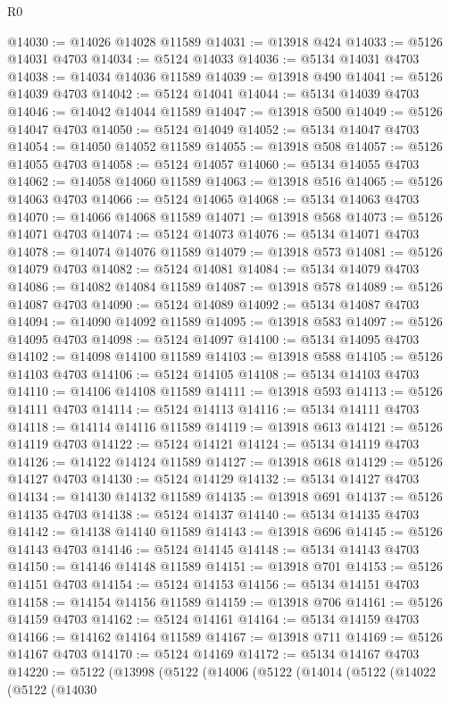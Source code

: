 \begin{lexlean}{R0}
\begin{coremodule}
@14030 := @14026 @14028 @11589
@14031 := @13918 @424
@14033 := @5126 @14031 @4703
@14034 := @5124 @14033
@14036 := @5134 @14031 @4703
@14038 := @14034 @14036 @11589
@14039 := @13918 @490
@14041 := @5126 @14039 @4703
@14042 := @5124 @14041
@14044 := @5134 @14039 @4703
@14046 := @14042 @14044 @11589
@14047 := @13918 @500
@14049 := @5126 @14047 @4703
@14050 := @5124 @14049
@14052 := @5134 @14047 @4703
@14054 := @14050 @14052 @11589
@14055 := @13918 @508
@14057 := @5126 @14055 @4703
@14058 := @5124 @14057
@14060 := @5134 @14055 @4703
@14062 := @14058 @14060 @11589
@14063 := @13918 @516
@14065 := @5126 @14063 @4703
@14066 := @5124 @14065
@14068 := @5134 @14063 @4703
@14070 := @14066 @14068 @11589
@14071 := @13918 @568
@14073 := @5126 @14071 @4703
@14074 := @5124 @14073
@14076 := @5134 @14071 @4703
@14078 := @14074 @14076 @11589
@14079 := @13918 @573
@14081 := @5126 @14079 @4703
@14082 := @5124 @14081
@14084 := @5134 @14079 @4703
@14086 := @14082 @14084 @11589
@14087 := @13918 @578
@14089 := @5126 @14087 @4703
@14090 := @5124 @14089
@14092 := @5134 @14087 @4703
@14094 := @14090 @14092 @11589
@14095 := @13918 @583
@14097 := @5126 @14095 @4703
@14098 := @5124 @14097
@14100 := @5134 @14095 @4703
@14102 := @14098 @14100 @11589
@14103 := @13918 @588
@14105 := @5126 @14103 @4703
@14106 := @5124 @14105
@14108 := @5134 @14103 @4703
@14110 := @14106 @14108 @11589
@14111 := @13918 @593
@14113 := @5126 @14111 @4703
@14114 := @5124 @14113
@14116 := @5134 @14111 @4703
@14118 := @14114 @14116 @11589
@14119 := @13918 @613
@14121 := @5126 @14119 @4703
@14122 := @5124 @14121
@14124 := @5134 @14119 @4703
@14126 := @14122 @14124 @11589
@14127 := @13918 @618
@14129 := @5126 @14127 @4703
@14130 := @5124 @14129
@14132 := @5134 @14127 @4703
@14134 := @14130 @14132 @11589
@14135 := @13918 @691
@14137 := @5126 @14135 @4703
@14138 := @5124 @14137
@14140 := @5134 @14135 @4703
@14142 := @14138 @14140 @11589
@14143 := @13918 @696
@14145 := @5126 @14143 @4703
@14146 := @5124 @14145
@14148 := @5134 @14143 @4703
@14150 := @14146 @14148 @11589
@14151 := @13918 @701
@14153 := @5126 @14151 @4703
@14154 := @5124 @14153
@14156 := @5134 @14151 @4703
@14158 := @14154 @14156 @11589
@14159 := @13918 @706
@14161 := @5126 @14159 @4703
@14162 := @5124 @14161
@14164 := @5134 @14159 @4703
@14166 := @14162 @14164 @11589
@14167 := @13918 @711
@14169 := @5126 @14167 @4703
@14170 := @5124 @14169
@14172 := @5134 @14167 @4703
@14220 := @5122
    (@13998
      (@5122
        (@14006
          (@5122
            (@14014
              (@5122
                (@14022
                  (@5122
                    (@14030

\end{coremodule}
\end{lexlean}
